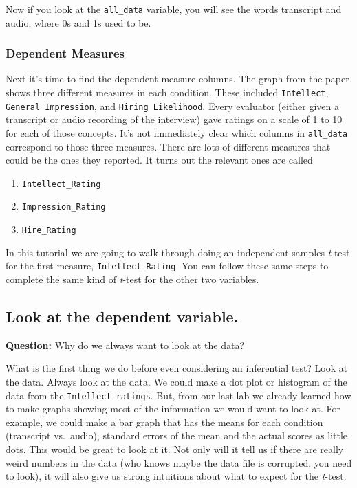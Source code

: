 \documentclass[
]{book}
\providecommand{\tightlist}{%
  \setlength{\itemsep}{0pt}\setlength{\parskip}{0pt}}
\begin{document}
Now if you look at the \texttt{all\_data} variable, you will see the words transcript and audio, where 0s and 1s used to be.

\hypertarget{dependent-measures}{%
\subsubsection{Dependent Measures}\label{dependent-measures}}

Next it's time to find the dependent measure columns. The graph from the paper shows three different measures in each condition. These included \texttt{Intellect}, \texttt{General\ Impression}, and \texttt{Hiring\ Likelihood}. Every evaluator (either given a transcript or audio recording of the interview) gave ratings on a scale of 1 to 10 for each of those concepts. It's not immediately clear which columns in \texttt{all\_data} correspond to those three measures. There are lots of different measures that could be the ones they reported. It turns out the relevant ones are called

\begin{enumerate}
\def\labelenumi{\arabic{enumi}.}
\tightlist
\item
  \texttt{Intellect\_Rating}
\item
  \texttt{Impression\_Rating}
\item
  \texttt{Hire\_Rating}
\end{enumerate}

In this tutorial we are going to walk through doing an independent samples \emph{t}-test for the first measure, \texttt{Intellect\_Rating}. You can follow these same steps to complete the same kind of \emph{t}-test for the other two variables.

\hypertarget{look-at-the-dependent-variable.}{%
\subsection{Look at the dependent variable.}\label{look-at-the-dependent-variable.}}

\textbf{Question:} Why do we always want to look at the data?

What is the first thing we do before even considering an inferential test? Look at the data. Always look at the data. We could make a dot plot or histogram of the data from the \texttt{Intellect\_ratings}. But, from our last lab we already learned how to make graphs showing most of the information we would want to look at. For example, we could make a bar graph that has the means for each condition (transcript vs.~audio), standard errors of the mean and the actual scores as little dots. This would be great to look at it. Not only will it tell us if there are really weird numbers in the data (who knows maybe the data file is corrupted, you need to look), it will also give us strong intuitions about what to expect for the \emph{t}-test.
\end{document}
